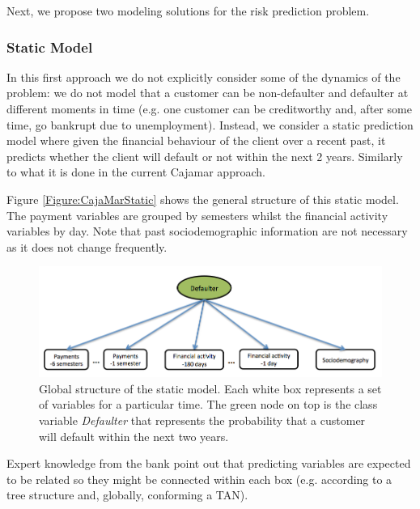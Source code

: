 Next, we propose two modeling solutions for the risk prediction problem.



\subsubsection*{Static Model} 

In this first approach we do not explicitly consider some of the dynamics of the problem: we do not model that a customer can be non-defaulter and defaulter at different moments in time (e.g. one customer can be creditworthy and, after some time, go bankrupt due to unemployment). Instead, we consider a static prediction model where given the financial behaviour of the client over a recent past, it predicts whether the client will default or not within the next 2 years. Similarly to what it is done in the current Cajamar approach. 

Figure \ref{Figure:CajaMarStatic} shows the general structure of this static model. The payment variables are grouped by semesters whilst the financial activity variables by day. Note that past sociodemographic information are not necessary as it does not change frequently.

\begin{figure}[htbp]
  \centering
\includegraphics[scale=0.5]{./figures/CajaMarModel0}
\caption{\label{Figure:CajaMarStatic}Global structure of the static model. Each white box represents a set of variables for a particular time. The green node on top is the class variable \emph{Defaulter} that represents the probability that a customer will default within the next two years. } 
\label{fig:static}
\end{figure}

Expert knowledge from the bank point out that predicting variables are expected to be related so they might be connected within each box (e.g. according to a tree structure and, globally, conforming a TAN). 




